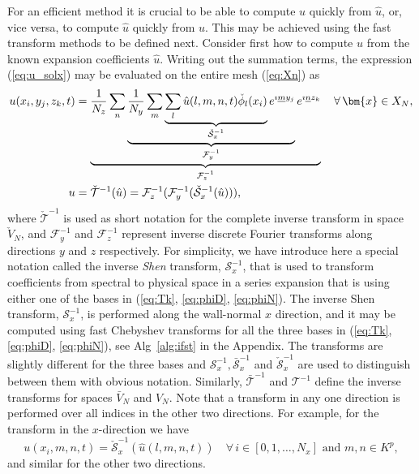 \documentclass[preprint]{elsarticle}
\newcommand{\N}[1]{\check{#1}}
\newcommand{\D}[1]{\bar{#1}}
\begin{document}
For an efficient method it is crucial to be able to compute $u$ quickly from $\hat{u}$, or, vice versa, to compute $\hat{u}$ quickly from $u$. This may be achieved using the fast transform methods to be defined next.
Consider first how to compute $u$ from the known expansion coefficients $\hat{u}$. Writing out the summation terms, the expression (\ref{eq:u_solx}) may be 
evaluated on the entire mesh (\ref{eq:Xn}) as
\begin{align}
u(x_i, y_j, z_k, t) &= \underbrace{\frac{1}{N_z}\sum_n 
\underbrace{\frac{1}{N_y} \sum_m \underbrace{\sum_l 
\hat{u}(l,m,n,t)\N{\phi}_l(x_i)}_{\N{\mathcal{S}}_x^{-1}} e^{\imath 
\underline{m} 
y_j}}_{\mathcal{F}_y^{-1}} e^{\imath \underline{n} z_k}}_{\mathcal{F}_z^{-1}} 
\quad \forall \, \bm{x} \in X_N, \notag \\
  u &= \N{\mathcal{T}}^{-1}(\hat{u}) =  \mathcal{F}^{-1}_z (\mathcal{F}^{-1}_y 
  (\N{\mathcal{S}}^{-1}_x (\hat{u}))),
  \label{eq:ifft} 
\end{align}
where $\N{\mathcal{T}}^{-1}$ is used as short notation for the complete inverse 
transform in space $\N{V}_N$, and $\mathcal{F}_{y}^{-1}$ and $\mathcal{F}_{z}^{-1}$ represent inverse discrete
Fourier transforms along directions $y$ and $z$ respectively. For simplicity, we have introduce here a special notation called the inverse 
\emph{Shen} transform, ${\mathcal{S}}^{-1}_x$, that is used to transform coefficients from spectral to physical space in a series expansion that is using either one of the bases in (\ref{eq:Tk}, \ref{eq:phiD}, \ref{eq:phiN}). The inverse Shen transform, $\mathcal{S}^{-1}_x$, is performed along the wall-normal 
$x$ direction, and it may be computed using fast 
Chebyshev transforms for all the three bases in (\ref{eq:Tk}, \ref{eq:phiD}, 
\ref{eq:phiN}), see Alg~\ref{alg:ifst} in the Appendix. The transforms are slightly different for the three 
bases and 
${\mathcal{S}}_x^{-1}, \D{\mathcal{S}}_x^{-1}$ and $\N{\mathcal{S}}_x^{-1}$ are used 
to distinguish between them with obvious notation. Similarly, $\D{\mathcal{T}}^{-1}$ and ${\mathcal{T}}^{-1}$ define the inverse transforms for spaces $\D{V}_N$ and $V_N$. Note that a transform in  any one direction is performed over all indices in the other two directions. For example, for the transform in the $x$-direction we have
\begin{equation}
u(x_i,m,n,t) = \N{\mathcal{S}}_x^{-1}(\hat{u}(l,m,n,t)) \quad \forall \, i \in [0,1,\ldots, N_x] \text{ and }  m,n \in {K}^p,
\end{equation}
and similar for the other two directions.
\end{document}
